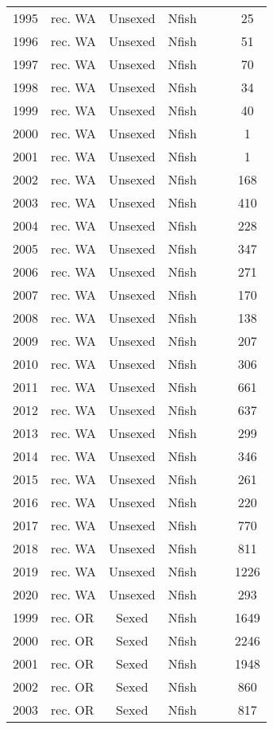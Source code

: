 \begin{longtable}[t]{c>{\centering\arraybackslash}p{3cm}ccccc}
1995 & rec. WA & Unsexed & Nfish &  &  & 25\\
1996 & rec. WA & Unsexed & Nfish &  &  & 51\\
1997 & rec. WA & Unsexed & Nfish &  &  & 70\\
1998 & rec. WA & Unsexed & Nfish &  &  & 34\\
1999 & rec. WA & Unsexed & Nfish &  &  & 40\\
2000 & rec. WA & Unsexed & Nfish &  &  & 1\\
2001 & rec. WA & Unsexed & Nfish &  &  & 1\\
2002 & rec. WA & Unsexed & Nfish &  &  & 168\\
2003 & rec. WA & Unsexed & Nfish &  &  & 410\\
2004 & rec. WA & Unsexed & Nfish &  &  & 228\\
2005 & rec. WA & Unsexed & Nfish &  &  & 347\\
2006 & rec. WA & Unsexed & Nfish &  &  & 271\\
2007 & rec. WA & Unsexed & Nfish &  &  & 170\\
2008 & rec. WA & Unsexed & Nfish &  &  & 138\\
2009 & rec. WA & Unsexed & Nfish &  &  & 207\\
2010 & rec. WA & Unsexed & Nfish &  &  & 306\\
2011 & rec. WA & Unsexed & Nfish &  &  & 661\\
2012 & rec. WA & Unsexed & Nfish &  &  & 637\\
2013 & rec. WA & Unsexed & Nfish &  &  & 299\\
2014 & rec. WA & Unsexed & Nfish &  &  & 346\\
2015 & rec. WA & Unsexed & Nfish &  &  & 261\\
2016 & rec. WA & Unsexed & Nfish &  &  & 220\\
2017 & rec. WA & Unsexed & Nfish &  &  & 770\\
2018 & rec. WA & Unsexed & Nfish &  &  & 811\\
2019 & rec. WA & Unsexed & Nfish &  &  & 1226\\
2020 & rec. WA & Unsexed & Nfish &  &  & 293\\
1999 & rec. OR & Sexed & Nfish &  &  & 1649\\
2000 & rec. OR & Sexed & Nfish &  &  & 2246\\
2001 & rec. OR & Sexed & Nfish &  &  & 1948\\
2002 & rec. OR & Sexed & Nfish &  &  & 860\\
2003 & rec. OR & Sexed & Nfish &  &  & 817\\

\end{longtable}
